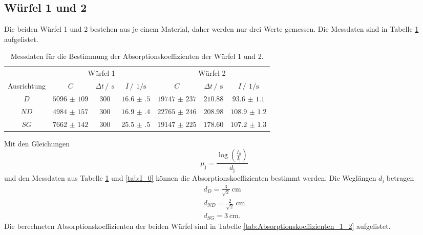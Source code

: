 \subsection{Würfel 1 und 2}
Die beiden Würfel 1 und 2 bestehen aus je einem Material, daher werden nur drei Werte gemessen.
Die Messdaten sind in Tabelle \ref{tab:Würfel_1_2} aufgelistet.
\FloatBarrier
\begin{table}
    \centering
    \caption{Messdaten für die Bestimmung der Absorptionskoeffizienten der Würfel 1 und 2.}
    \label{tab:Würfel_1_2}
    \begin{tabular}{c c c c c c c}
        \toprule
        &\multicolumn{3}{c}{Würfel 1}&\multicolumn{3}{c}{Würfel 2}\\
        \cmidrule(lr){2-4}\cmidrule(lr){5-7}
        Ausrichtung&$C$&$\Delta t \,/\,\SI{}{\second}$&$I \,/\,\SI{}{1\per\second}$&$C$&$\Delta t \,/\,\SI{}{\second}$&$I \,/\,\SI{}{1\per\second}$\\
        \midrule
        $D$ &$\num{5096(109)}$&$\num{300}$&$\num{16.6(5)}$&$\num{19747(237)}$&$\num{210.88}$&$\num{93.6(11)}$\\
        $ND$&$\num{4984(157)}$&$\num{300}$&$\num{16.9(4)}$&$\num{22765(246)}$&$\num{208.98}$&$\num{108.9(12)}$\\
        $SG$&$\num{7662(142)}$&$\num{300}$&$\num{25.5(5)}$&$\num{19147(225)}$&$\num{178.60}$&$\num{107.2(13)}$\\
        \bottomrule
    \end{tabular}
\end{table}
\FloatBarrier
Mit den Gleichungen
\begin{equation*}
    \mu_{\text{j}}= \frac{\log{\left(\frac{I_0}{I_\text{j}}\right)}}{d_{\text{j}}}
\end{equation*} 
und den Messdaten aus Tabelle \ref{tab:Würfel_1_2} und \ref{tab:I_0} können die Absorptionskoeffizienten bestimmt werden. 
Die Weglängen $d_{\text{j}}$ betragen
\begin{gather*}
    d_{D} =\frac{3}{\sqrt{2}}\SI{}{\centi\meter}\\
    d_{ND}=\frac{2}{\sqrt{2}}\SI{}{\centi\meter}\\
    d_{SG}=\SI{3}{\centi\meter}.
\end{gather*}
Die berechneten Absorptionskoeffizienten der beiden Würfel sind in Tabelle \ref{tab:Absorptionskoeffizienten_1_2} aufgelistet.
\FloatBarrier
